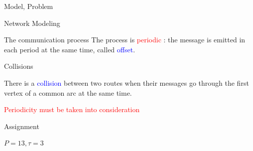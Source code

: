 \documentclass[10 pt]{beamer}
\begin{document}
\begin{section}{Model, Problem}
\begin{subsection}{Network Modeling}
\begin{frame}{The communication process}
   The process is \textcolor{red}{periodic} : the message is emitted in each period at the same time, called \textcolor{blue}{offset}.
   
\end{frame}


 \begin{frame}{Collisions}

\begin{center}
\end{center}
\vspace{1cm}
\centering
There is a \textcolor{blue}{collision} between two routes when their messages go through the first vertex of a common arc at the same time.
\vspace{0.5cm}

 \textcolor{red}{Periodicity must be taken into consideration} 
\end{frame}

 \begin{frame}{Assignment }

 $P=13, \tau = 3$ 
 
\begin{center}
 \begin{multicols}{2}
\scalebox{0.6}{

}
\end{multicols}
\end{center}
\end{frame}
\end{subsection}
\end{section}
\end{document}
